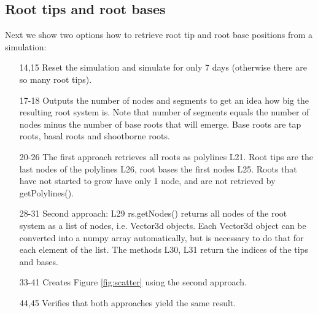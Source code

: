 \subsection{Root tips and root bases}

Next we show two options how to retrieve root tip and root base positions from a simulation:



\begin{itemize}

\item[14,15] Reset the simulation and simulate for only 7 days (otherwise there are so many root tips).

\item[17-18] Outputs the number of nodes and segments to get an idea how big the resulting root system is. 
Note that number of segments equals the number of nodes minus the number of base roots that will emerge. 
Base roots are tap roots, basal roots and shootborne roots.

\item[20-26] The first approach retrieves all roots as polylines L21. 
Root tips are the last nodes of the polylines L26, root bases the first nodes L25. Roots that have not started to grow have only 1 node, and are not retrieved by getPolylines().

\item[28-31] Second approach: L29 rs.getNodes() returns all nodes of the root system as a list of nodes, i.e. Vector3d objects. Each Vector3d object can be converted into a numpy array automatically, but is necessary to do that for each element of the list. The methods L30, L31 return the indices of the tips and bases. 

\item[33-41] Creates Figure \ref{fig:scatter} using the second approach.

\item[44,45] Verifies that both approaches yield the same result.

\end{itemize}

